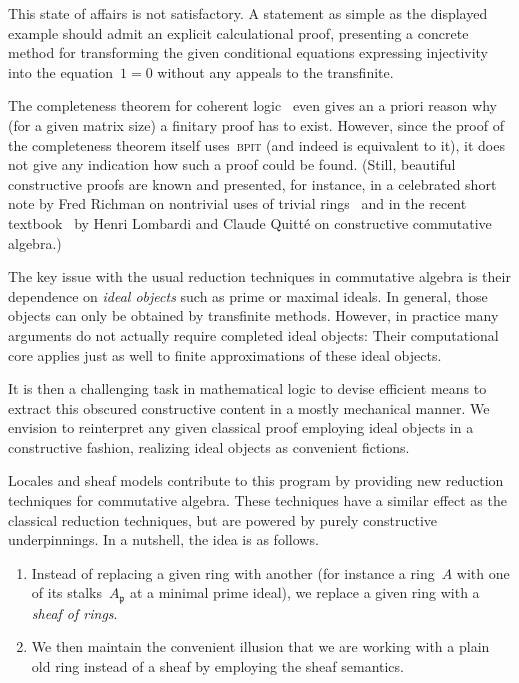 \documentclass{ws-rv9x6}
\newcommand{\ppp}{\mathfrak{p}}
\renewcommand{\_}{\mathpunct{.}}
\newcommand{\?}{\,{:}\,}
\newcommand{\BPIT}{\textsc{bpit}\xspace}
\begin{document}
This state of affairs is not satisfactory. A statement as simple as the
displayed example should admit an explicit calculational proof, presenting a
concrete method for transforming the given conditional equations expressing
injectivity into the equation~$1 = 0$ without any appeals to the transfinite.

The completeness theorem for coherent logic~\cite[Corollary~D1.5.10]{johnstone:elephant} even
gives an a priori reason why (for a given matrix size) a finitary proof has to
exist. However, since the proof of the completeness theorem itself uses~\BPIT
(and indeed is equivalent to it), it does not give any indication how such a
proof could be found. (Still, beautiful constructive proofs are known and
presented, for instance, in a celebrated short note by Fred Richman on nontrivial
uses of trivial rings~\cite{richman:trivial-rings} and in the recent
textbook~\cite{lombardi-quitte:constructive-algebra} by Henri Lombardi and
Claude Quitté on constructive commutative algebra.)

The key issue with the usual reduction techniques in commutative algebra is
their dependence on \emph{ideal objects} such as prime or maximal ideals. In
general, those objects can only be obtained by transfinite methods. However, in
practice many arguments do not actually require completed ideal objects:
Their computational core applies just as well to finite approximations of
these ideal objects.

It is then a challenging task in mathematical logic to devise efficient means to
extract this obscured constructive content in a mostly mechanical manner. We
envision to reinterpret any given classical proof employing ideal objects in a
constructive fashion, realizing ideal objects as convenient fictions.

Locales and sheaf models contribute to this program by providing new reduction
techniques for commutative algebra. These techniques have a similar effect as the
classical reduction techniques, but are powered by purely constructive
underpinnings. In a nutshell, the idea is as follows.

\begin{enumerate}
\item Instead of replacing a given ring with another (for instance a ring~$A$ with
one of its stalks~$A_\ppp$ at a minimal prime ideal), we replace a given ring
with a \emph{sheaf of rings}.
\item We then maintain the convenient illusion that we are working with a plain old ring
instead of a sheaf by employing the sheaf semantics.
\end{enumerate}
\end{document}

